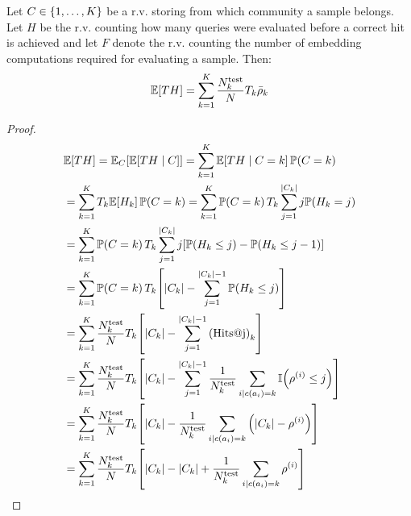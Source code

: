 \begin{lemma}
    \label{lemma:expected_evaluations}
    Let $C \in \mathopen{}\left\{1,\dots,K\right\}$ be a r.v. storing from which community a sample belongs. Let $H$ be the r.v. counting how many queries were evaluated before a correct hit is achieved and let $F$ denote the r.v. counting the number of embedding computations required for evaluating a sample. Then:
    $$\mathbb{E}\mathopen{}\left[T H\right] = \sum_{k=1}^{K}{\frac{N_k^{\text{test}}}{N} T_k \bar{\rho}_k}$$
\end{lemma}
\begin{proof}
    \begin{align*}
        &\mathbb{E}\off{T H} = \mathbb{E}_{C}\off{\mathbb{E}\off{T H \mid C}}%
        = \sum_{k=1}^{K}{\mathbb{E}\off{T H \mid C=k} \mathbb{P}\of{C=k}}%
        \\
        &= \sum_{k=1}^{K}{T_k \mathbb{E}\off{H_k} \mathbb{P}\of{C=k}}%
        = \sum_{k=1}^{K}{\mathbb{P}\of{C=k} T_k \sum_{j=1}^{\abs{C_k}}{j \mathbb{P}\of{H_k=j}}}%
        \\
        &= \sum_{k=1}^{K}{\mathbb{P}\of{C=k} T_k \sum_{j=1}^{\abs{C_k}}{j \off{\mathbb{P}\of{H_k \leq j} - \mathbb{P}\of{H_k \leq j-1}}}}%
        \\
        &= \sum_{k=1}^{K}{\mathbb{P}\of{C=k} T_k \off{\abs{C_k}- \sum_{j=1}^{\abs{C_k}-1}{\mathbb{P}\of{H_k \leq j}}}}%
        \\
        &= \sum_{k=1}^{K}{\frac{N_k^{\text{test}}}{N} T_k \off{\abs{C_k}- \sum_{j=1}^{\abs{C_k}-1}{\of{\text{Hits@j}}_k}}}%
        \\
        &= \sum_{k=1}^{K}{\frac{N_k^{\text{test}}}{N} T_k \off{\abs{C_k}- \sum_{j=1}^{\abs{C_k}-1}{\frac{1}{N_k^{\text{test}}}\sum_{i \mid c\of{a_i}=k}{\mathbb{I}\of{\rho^{\of{i}} \leq j}}}}}%
        \\
        &= \sum_{k=1}^{K}{\frac{N_k^{\text{test}}}{N} T_k \off{\abs{C_k}- \frac{1}{N_k^{\text{test}}}\sum_{i \mid c\of{a_i}=k}{\of{\abs{C_k}- \rho^{\of{i}}}}}}%
        \\
        &= \sum_{k=1}^{K}{\frac{N_k^{\text{test}}}{N} T_k \off{\abs{C_k}- \abs{C_k} + \frac{1}{N_k^{\text{test}}}\sum_{i \mid c\of{a_i}=k}{\rho^{\of{i}}}}}%

\end{align*}
\end{proof}
